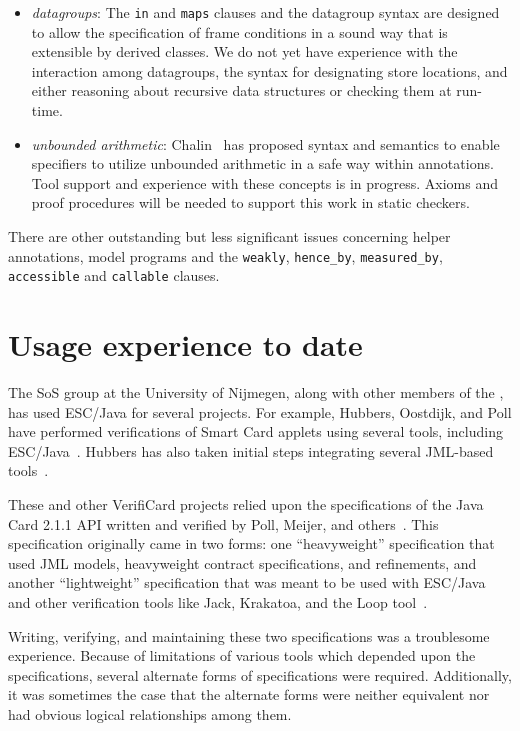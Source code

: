 \documentclass{llncs}
\begin{document}
\begin{itemize}
\item \textit{datagroups}: The \texttt{in} and \texttt{maps} clauses
  and the datagroup syntax are designed to allow the specification of
  frame conditions in a sound way that is extensible by derived
  classes.  We do not yet have experience with the interaction among
  datagroups, the syntax for designating store locations, and either
  reasoning about recursive data structures or checking them at
  run-time.
\item \textit{unbounded arithmetic}: Chalin~\cite{Chalin03} has
  proposed syntax and semantics to enable specifiers to utilize
  unbounded arithmetic in a safe way within annotations.  Tool support
  and experience with these concepts is in progress.  Axioms and proof
  procedures will be needed to support this work in static checkers.
\end{itemize}
There are other outstanding but less significant issues concerning
helper annotations, model programs and the \texttt{weakly},
\texttt{hence\_by}, \texttt{measured\_by}, \texttt{accessible} and
\texttt{callable} clauses.

\section{Usage experience to date}
\label{sec:usage-exper-date}
The SoS group at the University of Nijmegen, along with other members
of the , has used ESC/Java for several
projects.  For example, Hubbers, Oostdijk, and Poll have performed
verifications of Smart Card applets using several tools, including
ESC/Java~\cite{HOP04}.  Hubbers has also taken initial steps
integrating several JML-based tools~\cite{Hub03}.

These and other VerifiCard projects relied upon the specifications of
the Java Card 2.1.1 API written and verified by Poll, Meijer, and
others~\cite{MeijerPoll01}.  This specification originally came in two
forms: one ``heavyweight'' specification that used JML models,
heavyweight contract specifications, and refinements, and another
``lightweight'' specification that was meant to be used with ESC/Java
and other verification tools like Jack, Krakatoa, and the Loop
tool~\cite{BergJ01,BurdyRequet02,MarchePaulinMohringUrbain04}.

Writing, verifying, and maintaining these two specifications was a
troublesome experience.  Because of limitations of various tools which
depended upon the specifications, several alternate forms of
specifications were required.  Additionally, it was sometimes the case
that the alternate forms were neither equivalent nor had obvious
logical relationships among them.
\end{document}
